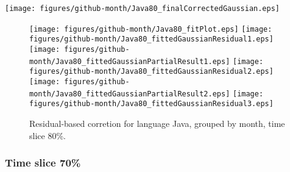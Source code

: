 \begin{center}
{\texttt{[image: figures/github-month/Java80\_finalCorrectedGaussian.eps]}}
\end{center}

\FloatBarrier

\begin{figure}[t]
\centering
{}
{\texttt{[image: figures/github-month/Java80\_fitPlot.eps]}}
{\texttt{[image: figures/github-month/Java80\_fittedGaussianResidual1.eps]}}
{\texttt{[image: figures/github-month/Java80\_fittedGaussianPartialResult1.eps]}}
{\texttt{[image: figures/github-month/Java80\_fittedGaussianResidual2.eps]}}
{\texttt{[image: figures/github-month/Java80\_fittedGaussianPartialResult2.eps]}}
{\texttt{[image: figures/github-month/Java80\_fittedGaussianResidual3.eps]}}
\caption{Residual-based corretion for language Java, grouped by month, time slice 80\%.}
\end{figure}


\FloatBarrier


\subsubsection{Time slice 70\%}

